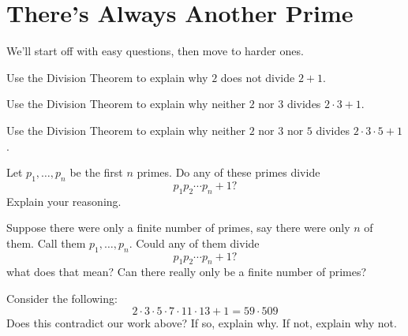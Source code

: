 \newpage
\section{There's Always Another Prime}\label{A:Pr}

We'll start off with easy questions, then move to harder ones.

\begin{prob}
Use the Division Theorem to explain why $2$ does not divide $2+1$.
\end{prob}

\begin{prob}
Use the Division Theorem to explain why neither $2$ nor $3$ divides
$2\cdot 3+1$.
\end{prob}

\begin{prob}
Use the Division Theorem to explain why neither $2$ nor $3$ nor $5$ divides
$2\cdot 3\cdot 5+1$.
\end{prob}

\begin{prob} 
Let $p_1,\dots, p_n$ be the first $n$ primes. Do any of these primes divide 
\[
p_1p_2\cdots p_n + 1?
\]
Explain your reasoning.
\end{prob}


\begin{prob} 
Suppose there were only a finite number of primes, say there were only
$n$ of them. Call them $p_1,\dots, p_n$. Could any of them divide
\[
p_1p_2\cdots p_n + 1?
\]
what does that mean? Can there really only be a finite number of
primes?
\end{prob}



\begin{prob} 
Consider the following:
\[
2\cdot 3\cdot 5\cdot 7 \cdot 11\cdot 13 + 1 = 59\cdot 509
\] 
Does this contradict our work above? If so, explain why. If not, explain
why not.
\end{prob}


